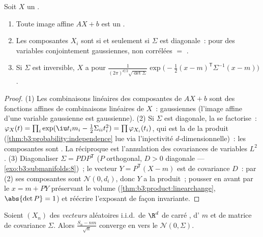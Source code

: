 \begin{theorem}\label{thm:b3:clt:gaussianvector}
Soit $X$ un .
\begin{enumerate}
  \item Toute image affine $AX + b$ est un .
  \item Les composantes $X_i$ sont \emph{} si
        et seulement si $\Sigma$ est diagonale~: pour des
        variables conjointement gaussiennes, non corrélées
        $=$ .
  \item Si $\Sigma$ est inversible, $X$ a pour 
        $\frac{1}{(2\pi)^{d/2}\sqrt{\det\Sigma}}
        \exp\bigl(-\frac12(x - m)^{\mathsf T}\Sigma^{-1}(x -
        m)\bigr)$.
\end{enumerate}
\end{theorem}

\begin{proof}
(1) Les combinaisons linéaires des composantes de $AX + b$
sont des fonctions affines de combinaisons linéaires de
$X$~: gaussiennes (l'image affine d'une variable gaussienne
est gaussienne).
(2) Si $\Sigma$ est diagonale, la 
se factorise~: $\varphi_X(t) = \prod_i\exp(\iu t_im_i -
\frac12\Sigma_{ii}t_i^2) = \prod\varphi_{X_i}(t_i)$, qui est
la  de la  produit
(\cref{thm:b3:probability:independence} lue via
l'injectivité $d$-dimensionnelle)~: les composantes sont
. La réciproque est l'annulation des
covariances de variables $L^2$ .
(3) Diagonaliser $\Sigma = P D P^{\mathsf T}$ ($P$
orthogonal, $D > 0$ diagonale ---
\cref{exo:b3:submanifolds:8})~; le vecteur $Y = P^{\mathsf
T}(X - m)$ est  de covariance $D$~: par (2) ses
composantes sont  $\mathcal N(0, d_i)$, donc
$Y$ a la  produit~; pousser en avant par le
$x = m + PY$ préservant le volume
(\cref{thm:b3:product:linearchange}, $\abs{\det P} = 1$) et
réécrire l'exposant de façon invariante.
\end{proof}

\begin{theorem}
\label{thm:b3:clt:multiclt}
Soient $(X_n)$ des \emph{vecteurs} aléatoires i.i.d.\ de
$\R^d$ de carré , d' $m$ et de matrice
de covariance $\Sigma$. Alors $\frac{S_n - nm}{\sqrt n}$
converge en  vers le  $\mathcal N(0,
\Sigma)$.
\admitted
\end{theorem}

